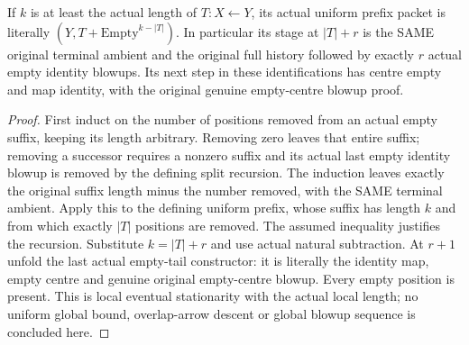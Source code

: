 \begin{theorem}
\label{hir:sharp-actual-curve-uniform-prefix-eventual-empty}
\leanok
If $k$ is at least the actual length of $T:X\leftarrow Y$, its actual uniform
prefix packet is literally $(Y,T\mathbin{+}\mathrm{Empty}^{k-|T|})$. In
particular its stage at $|T|+r$ is the SAME original terminal ambient and
the original full history followed by exactly $r$ actual empty identity
blowups. Its next step in these identifications has centre empty and map
identity, with the original genuine empty-centre blowup proof.
\end{theorem}
\begin{proof}
First induct on the number of positions removed from an actual empty
suffix, keeping its length arbitrary. Removing zero leaves that entire
suffix; removing a successor requires a nonzero suffix and its actual last
empty identity blowup is removed by the defining split recursion. The
induction leaves exactly the original suffix length minus the number
removed, with the SAME terminal ambient. Apply this to the defining
uniform prefix, whose suffix has length $k$ and from which exactly $|T|$
positions are removed. The assumed inequality justifies the recursion.
Substitute $k=|T|+r$ and use actual natural subtraction. At $r+1$ unfold the
last actual empty-tail constructor: it is literally the identity map,
empty centre and genuine original empty-centre blowup. Every empty position
is present. This is local eventual stationarity with the actual local
length; no uniform global bound, overlap-arrow descent or global blowup
sequence is concluded here.
\end{proof}
